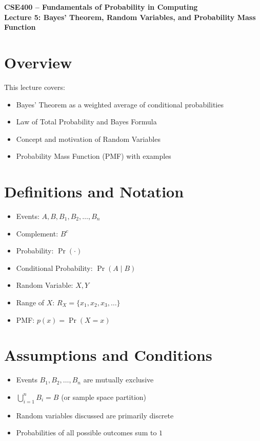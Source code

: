 \documentclass[12pt]{article}
\begin{document}
\begin{center}
\textbf{CSE400 – Fundamentals of Probability in Computing} \\[4pt]
\textbf{Lecture 5: Bayes’ Theorem, Random Variables, and Probability Mass Function}
\end{center}

\section{Overview}
This lecture covers:
\begin{itemize}[noitemsep]
\item Bayes’ Theorem as a weighted average of conditional probabilities
\item Law of Total Probability and Bayes Formula
\item Concept and motivation of Random Variables
\item Probability Mass Function (PMF) with examples
\end{itemize}

\section{Definitions and Notation}
\begin{itemize}[noitemsep]
\item Events: $A, B, B_1, B_2, \dots, B_n$
\item Complement: $B^c$
\item Probability: $\Pr(\cdot)$
\item Conditional Probability: $\Pr(A \mid B)$
\item Random Variable: $X, Y$
\item Range of $X$: $R_X = \{x_1, x_2, x_3, \dots\}$
\item PMF: $p(x) = \Pr(X = x)$
\end{itemize}

\section{Assumptions and Conditions}
\begin{itemize}[noitemsep]
\item Events $B_1, B_2, \dots, B_n$ are mutually exclusive
\item $\bigcup_{i=1}^n B_i = B$ (or sample space partition)
\item Random variables discussed are primarily discrete
\item Probabilities of all possible outcomes sum to $1$
\end{itemize}
\end{document}
